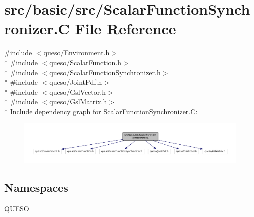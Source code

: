 \hypertarget{_scalar_function_synchronizer_8_c}{\section{src/basic/src/\-Scalar\-Function\-Synchronizer.C File Reference}
\label{_scalar_function_synchronizer_8_c}
}
{\ttfamily \#include $<$queso/\-Environment.\-h$>$}\\*
{\ttfamily \#include $<$queso/\-Scalar\-Function.\-h$>$}\\*
{\ttfamily \#include $<$queso/\-Scalar\-Function\-Synchronizer.\-h$>$}\\*
{\ttfamily \#include $<$queso/\-Joint\-Pdf.\-h$>$}\\*
{\ttfamily \#include $<$queso/\-Gsl\-Vector.\-h$>$}\\*
{\ttfamily \#include $<$queso/\-Gsl\-Matrix.\-h$>$}\\*
Include dependency graph for Scalar\-Function\-Synchronizer.\-C\-:
\nopagebreak
\begin{figure}[H]
\begin{center}
\leavevmode
\includegraphics[width=350pt]{_scalar_function_synchronizer_8_c__incl}
\end{center}
\end{figure}
\subsection*{Namespaces}
\begin{DoxyCompactItemize}
\item 
\hyperlink{namespace_q_u_e_s_o}{Q\-U\-E\-S\-O}
\end{DoxyCompactItemize}
